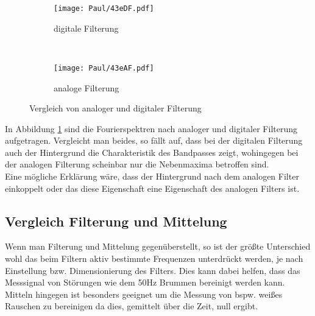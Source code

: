\begin{figure}[h]
    \centering
    \begin{subfigure}{0.9\textwidth}
        \centering
        \texttt{[image: Paul/43eDF.pdf]}
        \caption{digitale Filterung}
    \end{subfigure}
    \\
    \begin{subfigure}{0.9\textwidth}
        \centering
        \texttt{[image: Paul/43eAF.pdf]}
        \caption{analoge Filterung}
    \end{subfigure}
    \caption{Vergleich von analoger und digitaler Filterung}
    \label{fig:43e}
\end{figure}
\newpage
In Abbildung \ref{fig:43e} sind die Fourierspektren nach analoger und digitaler Filterung aufgetragen. Vergleicht man beides, so fällt auf, dass bei der digitalen Filterung auch der Hintergrund die Charakteristik des Bandpasses zeigt, wohingegen bei der analogen Filterung scheinbar nur die Nebenmaxima betroffen sind.\\
Eine mögliche Erklärung wäre, dass der Hintergrund nach dem analogen Filter einkoppelt oder das diese Eigenschaft eine Eigenschaft des analogen Filters ist.


\subsection{Vergleich Filterung und Mittelung}
Wenn man Filterung und Mittelung gegenüberstellt, so ist der größte Unterschied wohl das beim Filtern aktiv bestimmte Frequenzen unterdrückt werden, je nach Einstellung bzw. Dimensionierung des Filters. Dies kann dabei helfen, dass das Messsignal von Störungen wie dem 50Hz Brummen bereinigt werden kann.\\
Mitteln hingegen ist besonders geeignet um die Messung von bspw. weißes Rauschen zu bereinigen da dies, gemittelt über die Zeit, null ergibt.